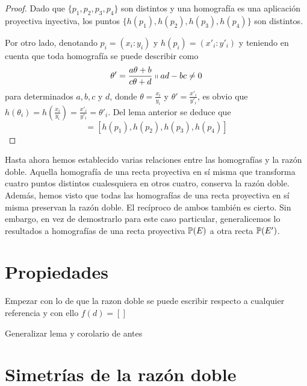 \begin{proof}
	Dado que $\{p_1,p_2,p_3,p_4\}$ son distintos y una homografía es una aplicación proyectiva inyectiva, los puntos $\{h(p_1),h(p_2),h(p_3),h(p_4)\}$ son distintos.
	
	Por otro lado, denotando $p_i=(x_i:y_i)$ y $h(p_i)=(x'_i:y'_i)$ y teniendo en cuenta que toda homografía se puede describir como 
	\begin{equation*}
		\theta'=\frac{a\theta+b}{c\theta +d}\shortparallel ad-bc\not=0
	\end{equation*}
	para determinados $a,b,c$ y $d$, donde $\theta=\frac{x_i}{y_i}$ y $\theta'=\frac{x'_i}{y'_i}$, es obvio que $h(\theta_i)=h(\frac{x_i}{y_i})=\frac{x'_i}{y'_i}=\theta'_i$. Del lema anterior se deduce que
	\begin{equation*}
		[p_1,p_2,p_3,p_4]=[h(p_1),h(p_2),h(p_3),h(p_4)]
	\end{equation*}
\end{proof}
Hasta ahora hemos establecido varias relaciones entre las homografías y la razón doble. Aquella homografía de una recta proyectiva en sí misma que transforma cuatro puntos distintos cualesquiera en otros cuatro, conserva la razón doble. Además, hemos visto que todas las homografías de una recta proyectiva en sí misma preservan la razón doble. El recíproco de ambos también es cierto. Sin embargo, en vez de demostrarlo para este caso particular, generalicemos lo resultados a homografías de una recta proyectiva $\mathbb{P}(E)$ a otra recta $\mathbb{P}(E')$.

\section{Propiedades}
Empezar con lo de que la razon doble se puede escribir respecto a cualquier referencia y con ello $f(d)=[]$

Generalizar lema y corolario de antes

\section{Simetrías de la razón doble}